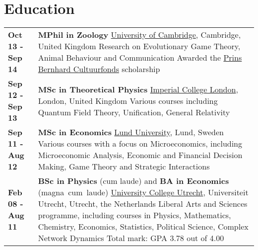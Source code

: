 \documentclass[a4paper,8pt]{extarticle}
\begin{document}
\vspace{-1mm}

\section*{Education}

\begin{center}
\setlength{\tabcolsep}{0mm}
\begin{tabular}{p{}p{}}
\textbf{Oct 13 - Sep 14}&\textbf{MPhil in Zoology}\newline
\href{https://www.zoo.cam.ac.uk}{University of Cambridge}, Cambridge, United Kingdom\newline
Research on Evolutionary Game Theory, Animal Behaviour and Communication\newline
Awarded the \href{http://www.prinsbernhardcultuurfonds.nl}{Prins Bernhard Cultuurfonds} scholarship
\vspace{2mm}\\
\textbf{Sep 12 - Sep 13}&\textbf{MSc in Theoretical Physics}\newline
\href{https://www.imperial.ac.uk}{Imperial College London}, London, United Kingdom\newline
Various courses including Quantum Field Theory, Unification, General Relativity
\vspace{2mm}\\
\textbf{Sep 11 - Aug 12}&\textbf{MSc in Economics}\newline
\href{http://www.lunduniversity.lu.se}{Lund University}, Lund, Sweden\newline
Various courses with a focus on Microeconomics, including Microeconomic Analysis, Economic and Financial Decision Making, Game Theory and Strategic Interactions
\vspace{2mm}\\
\textbf{Feb 08 - Aug 11}&\textbf{BSc in Physics} (cum laude) and \textbf{BA in Economics} (magna~cum~laude)\newline
\href{https://www.uu.nl/en/organisation/university-college-utrecht/}{University College Utrecht}, Universiteit Utrecht, Utrecht, the Netherlands\newline
Liberal Arts and Sciences programme, including courses in Physics, Mathematics, Chemistry, Economics, Statistics, Political Science, Complex Network Dynamics\newline
Total mark: GPA 3.78 out of 4.00
\vspace{2mm}\\

\end{tabular}
\end{center}
\end{document}
